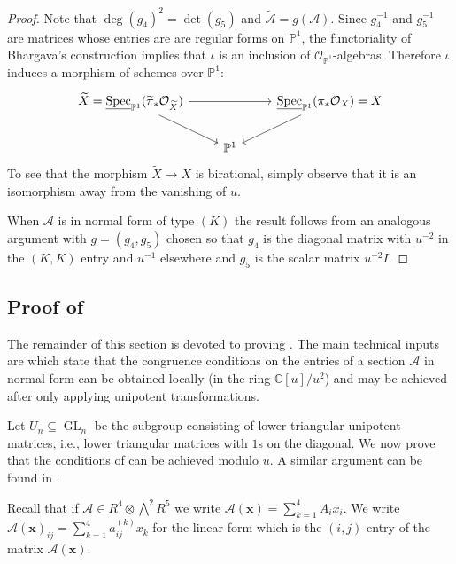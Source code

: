 \documentclass[11pt]{amsart}
\numberwithin{theorem}{section}
\numberwithin{equation}{section}
\theoremstyle{definition}\newtheorem{defn}[theorem]{Definition}
\theoremstyle{definition}\newtheorem{remark}[theorem]{Remark}
\theoremstyle{definition}\newtheorem{question}[theorem]{Question}
\theoremstyle{definition}\newtheorem{problem}[theorem]{Problem}
\newcommand{\CC}{\mathbb{C}}
\newcommand{\PP}{\mathbb{P}}
\newcommand{\cA}{\mathcal{A}}
\newcommand{\cO}{\mathcal{O}}
\DeclareMathOperator{\Spec}{Spec}
\DeclareMathOperator{\GL}{GL}
\renewcommand{\subset}{\subseteq}
\newcommand{\K}{K}
\begin{document}
\begin{proof}
Note that $\deg(g_4)^2 = \det(g_5)$ and $\widetilde{\cA} = g(\cA)$. Since $g_4^{-1}$ and $g_5^{-1}$ are matrices whose entries are are regular forms on $\PP^1$, the functoriality of Bhargava's construction implies that $\iota$ is an inclusion of $\cO_{\PP^1}$-algebras. Therefore $\iota$ induces a morphism of schemes over $\PP^1$:
\[
\begin{tikzcd}
	\widetilde{X} = \underline{\Spec}_{\PP^1}(\widetilde{\pi}_* \cO_{\widetilde{X}}) && \underline{\Spec}_{\PP^1}(\pi_* \cO_X) = X \\
	& \PP^1
	\arrow[from=1-1, to=1-3]
	\arrow[from=1-1, to=2-2]
	\arrow[from=1-3, to=2-2]
\end{tikzcd}
\]
To see that the morphism $\widetilde{X} \rightarrow X$ is birational, simply observe that it is an isomorphism away from the vanishing of $u$.

When $\cA$ is in normal form of type $(\K)$ the result follows from an analogous argument with $g = (g_4, g_5)$ chosen so that $g_4$ is the diagonal matrix with $u^{-2}$ in the $(\K,\K)$ entry and $u^{-1}$ elsewhere and $g_5$ is the scalar matrix $u^{-2} I$. 
\end{proof}

\subsection{Proof of }

The remainder of this section is devoted to proving . The main technical inputs are  which state that the congruence conditions on the entries of a section $\cA$ in normal form can be obtained locally (in the ring $\CC[u]/u^2$) and may be achieved after only applying unipotent transformations.

Let $U_n \subset \GL_n$ be the subgroup consisting of lower triangular unipotent matrices, i.e., lower triangular matrices with $1$s on the diagonal. We now prove that the conditions of  can be achieved modulo $u$. A similar argument can be found in \cite[Section~4.2]{B-geomsieve}. 

Recall that if $\cA \in R^4 \otimes \bigwedge^2 R^5$ we write $\cA(\mathbf{x}) = \sum_{k=1}^4 A_i x_i$. We write $\cA(\mathbf{x})_{ij} = \sum_{k=1}^4 a_{ij}^{(k)} x_k$ for the linear form which is the $(i,j)$-entry of the matrix $\cA(\mathbf{x})$. 
\end{document}
